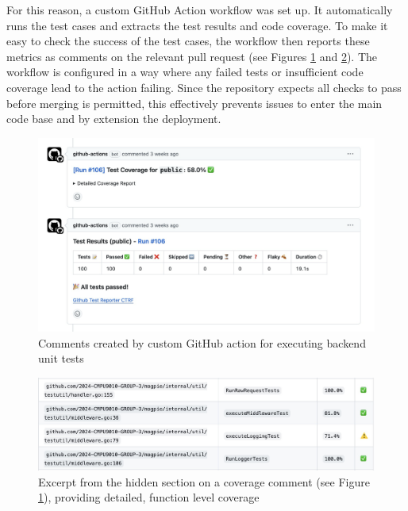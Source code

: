 For this reason, a custom GitHub Action workflow was set up. It automatically
runs the test cases and extracts the test results and code coverage. To make it
easy to check the success of the test cases, the workflow then reports these
metrics as comments on the relevant pull request (see Figures
\ref{fig:backend_github_action} and \ref{fig:backend_github_action_coverage}).
The workflow is configured in a way where any failed tests or insufficient code
coverage lead to the action failing. Since the repository expects all checks to
pass before merging is permitted, this effectively prevents issues to enter the
main code base and by extension the deployment.

\begin{figure}[htbp]
  \centering{}
  \includegraphics[width=\textwidth]{images/backend_github_action.png}
  \caption{Comments created by custom GitHub action for executing backend unit tests}
  \label{fig:backend_github_action}
\end{figure}

\begin{figure}[htbp]
  \centering{}
  \includegraphics[width=\textwidth]{images/backend_github_action_coverage.png}
  \caption{Excerpt from the hidden section on a coverage comment (see Figure
  \ref{fig:backend_github_action}), providing detailed, function level coverage}
  \label{fig:backend_github_action_coverage}
\end{figure}

